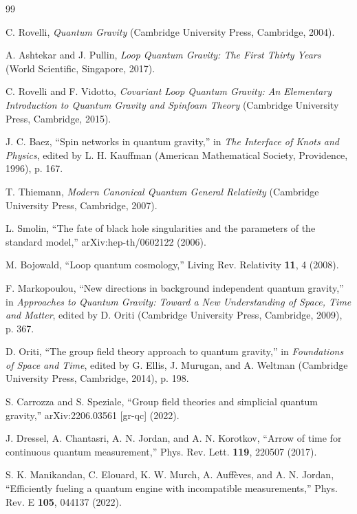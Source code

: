 \documentclass[twocolumn,aps,prd,showpacs,preprintnumbers,longbibliography]{revtex4-2}
\begin{document}
	
	\begin{thebibliography}{99}
		
		C. Rovelli, \textit{Quantum Gravity} (Cambridge University Press, Cambridge, 2004).
		
		A. Ashtekar and J. Pullin, \textit{Loop Quantum Gravity: The First Thirty Years} (World Scientific, Singapore, 2017).
		
		C. Rovelli and F. Vidotto, \textit{Covariant Loop Quantum Gravity: An Elementary Introduction to Quantum Gravity and Spinfoam Theory} (Cambridge University Press, Cambridge, 2015).
		
		J. C. Baez, “Spin networks in quantum gravity,” in \textit{The Interface of Knots and Physics}, edited by L. H. Kauffman (American Mathematical Society, Providence, 1996), p. 167.
		
		T. Thiemann, \textit{Modern Canonical Quantum General Relativity} (Cambridge University Press, Cambridge, 2007).
		
		L. Smolin, “The fate of black hole singularities and the parameters of the standard model,” arXiv:hep-th/0602122 (2006).
		
		M. Bojowald, “Loop quantum cosmology,” Living Rev. Relativity \textbf{11}, 4 (2008).
		
		F. Markopoulou, “New directions in background independent quantum gravity,” in \textit{Approaches to Quantum Gravity: Toward a New Understanding of Space, Time and Matter}, edited by D. Oriti (Cambridge University Press, Cambridge, 2009), p. 367.
		
		D. Oriti, “The group field theory approach to quantum gravity,” in \textit{Foundations of Space and Time}, edited by G. Ellis, J. Murugan, and A. Weltman (Cambridge University Press, Cambridge, 2014), p. 198.
		
		S. Carrozza and S. Speziale, “Group field theories and simplicial quantum gravity,” arXiv:2206.03561 [gr-qc] (2022).
		
		J. Dressel, A. Chantasri, A. N. Jordan, and A. N. Korotkov, “Arrow of time for continuous quantum measurement,” Phys. Rev. Lett. \textbf{119}, 220507 (2017).
		
		S. K. Manikandan, C. Elouard, K. W. Murch, A. Auffèves, and A. N. Jordan, “Efficiently fueling a quantum engine with incompatible measurements,” Phys. Rev. E \textbf{105}, 044137 (2022).
		

\end{thebibliography}
\end{document}
